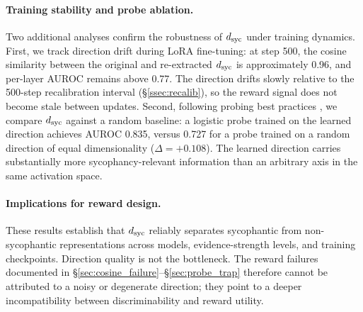 \paragraph{Training stability and probe ablation.}
Two additional analyses confirm the robustness of $d_{\text{syc}}$ under training dynamics.
First, we track direction drift during LoRA fine-tuning: at step 500, the cosine similarity between the original and re-extracted $d_{\text{syc}}$ is approximately 0.96, and per-layer AUROC remains above 0.77.
The direction drifts slowly relative to the 500-step recalibration interval (\S\ref{ssec:recalib}), so the reward signal does not become stale between updates.
Second, following probing best practices \citep{hewitt2019designing, belinkov2022probing}, we compare $d_{\text{syc}}$ against a random baseline: a logistic probe trained on the learned direction achieves AUROC 0.835, versus 0.727 for a probe trained on a random direction of equal dimensionality ($\Delta{=}{+}0.108$).
The learned direction carries substantially more sycophancy-relevant information than an arbitrary axis in the same activation space.

\paragraph{Implications for reward design.}
These results establish that $d_{\text{syc}}$ reliably separates sycophantic from non-sycophantic representations across models, evidence-strength levels, and training checkpoints.
Direction quality is not the bottleneck.
The reward failures documented in \S\ref{sec:cosine_failure}--\S\ref{sec:probe_trap} therefore cannot be attributed to a noisy or degenerate direction; they point to a deeper incompatibility between discriminability and reward utility.
